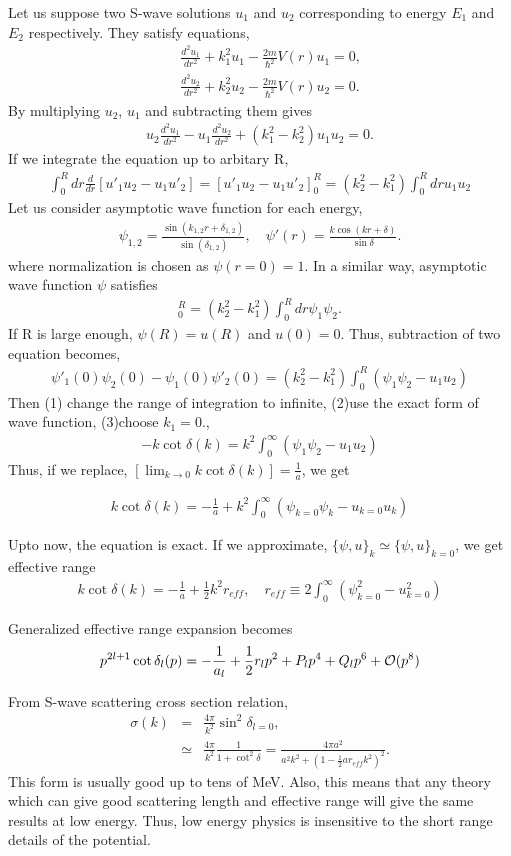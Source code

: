 \documentclass[10pt]{article}
\newcommand{\bea}{\begin{eqnarray}}
\newcommand{\eea}{\end{eqnarray}}
\newcommand{\no}{\nonumber \\}
\begin{document}
Let us suppose two S-wave solutions $u_1$ and $u_2$ corresponding to energy $E_1$
and $E_2$ respectively. They satisfy equations,
\bea
& &\frac{d^2 u_1}{dr^2}+k_1^2 u_1-\frac{2m}{\hbar^2}V(r)u_1=0,\no 
& &\frac{d^2 u_2}{dr^2}+k_2^2 u_2-\frac{2m}{\hbar^2}V(r)u_2=0.
\eea 
By multiplying $u_{2}$, $u_1$ and subtracting them gives
\bea 
u_2\frac{d^2 u_1}{dr^2}- u_1\frac{d^2 u_2}{dr^2}
+(k_1^2-k_2^2)u_1 u_2 =0.
\eea 
If we integrate the equation up to arbitary R,
\bea 
\int_0^R dr \frac{d}{dr}[u'_1 u_2-u_1 u'_2] =[u'_1 u_2-u_1 u'_2]_0^R
=(k_2^2-k_1^2)\int_0^R dr u_1 u_2
\eea 
Let us consider asymptotic wave function for each energy,
\bea 
\psi_{1,2}=\frac{\sin(k_{1,2} r+\delta_{1,2})}{\sin(\delta_{1,2})},
\quad \psi'(r)=\frac{k \cos(kr+\delta)}{\sin\delta}.
\eea 
where normalization is chosen as $\psi(r=0)=1$.
In a similar way, asymptotic wave function $\psi$ satisfies 
\bea 
[\psi'_1 \psi_2-\psi_1 \psi'_2]_0^R
=(k_2^2-k_1^2)\int_0^R dr \psi_1 \psi_2.
\eea 
If R is large enough, $\psi(R)=u(R)$
and $u(0)=0$. 
Thus, subtraction of two equation becomes,
\bea 
\psi'_1(0)\psi_2(0)-\psi_1(0)\psi'_2(0)
=(k_2^2-k_1^2)\int_0^R (\psi_1\psi_2-u_1 u_2)
\eea 
Then (1) change the range of integration to infinite, 
(2)use the exact form of wave function, (3)choose $k_1=0$.,
\bea 
[\lim_{k\to 0} k\cot\delta(k)]-k\cot\delta(k)
=k^2\int_0^\infty (\psi_1\psi_2-u_1 u_2)
\eea  
Thus, if we replace, $[\lim_{k\to 0} k\cot\delta(k)]=\frac{1}{a}$, we get

\bea 
\boxed{ 
k\cot\delta(k)=-\frac{1}{a}+k^2\int_0^\infty 
   (\psi_{k=0} \psi_k-u_{k=0} u_k )
}
\eea 

Upto now, the equation is exact. 
If we approximate, $\{\psi,u\}_k\simeq \{\psi,u \}_{k=0} $, we get effective range
\bea 
k\cot\delta(k)=-\frac{1}{a}+\frac{1}{2}k^2 r_{eff}, \quad 
r_{eff}\equiv 2 \int_0^\infty (\psi_{k=0}^2 -u_{k=0}^2) 
\eea   

Generalized effective range expansion becomes
\bea 
p^{2l+1}\cot\delta_l(p)=-\frac{1}{a_l}+\frac{1}{2}r_l p^2+P_l p^4+Q_l p^6+{\cal O}(p^8)
\eea 

From S-wave scattering cross section relation,
\bea 
\sigma(k) &=&\frac{4\pi}{k^2}\sin^2\delta_{l=0}, \no 
          &\simeq & \frac{4\pi}{k^2}\frac{1}{1+\cot^2\delta}
          =\frac{4\pi a^2}{a^2 k^2+(1-\frac{1}{2}a r_{eff}k^2)^2}.
\eea  
This form is usually good up to tens of MeV. 
Also, this means that any theory which can give 
good scattering length and
effective range will give the same results at low energy. 
Thus, low energy physics is insensitive to 
the short range details of the potential.
\end{document}
